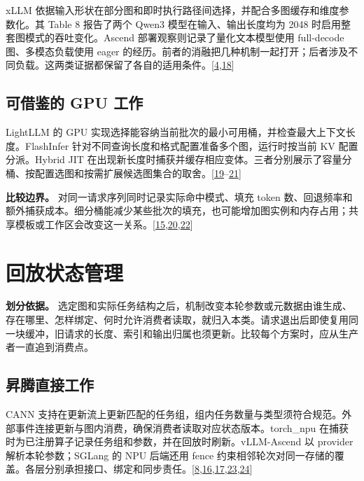 \documentclass[
  UTF8,
  zihao=5]{ctexart}
\begin{document}
xLLM
依据输入形状在部分图和即时执行路径间选择，并配合多图缓存和维度参数化。其
Table 8 报告了两个 Qwen3 模型在输入、输出长度均为 2048
时启用整套图模式的吞吐变化。Ascend 部署观察则记录了量化文本模型使用
full-decode 图、多模态负载使用 eager
的经历。前者的消融把几种机制一起打开；后者涉及不同负载。这两类证据都保留了各自的适用条件。{[}\protect\hyperlink{ref-liu2025xllm}{4},\protect\hyperlink{ref-yu2026ascendfield}{18}{]}

\hypertarget{ux53efux501fux9274ux7684-gpu-ux5de5ux4f5c-1}{%
\subsection{可借鉴的 GPU
工作}\label{ux53efux501fux9274ux7684-gpu-ux5de5ux4f5c-1}}

LightLLM 的 GPU
实现选择能容纳当前批次的最小可用桶，并检查最大上下文长度。FlashInfer
针对不同查询长度和格式配置准备多个图，运行时按当前 KV 配置分派。Hybrid
JIT
在出现新长度时捕获并缓存相应变体。三者分别展示了容量分桶、按配置选图和按需扩展候选图集合的取舍。{[}\protect\hyperlink{ref-lightllm2026code}{19}--\protect\hyperlink{ref-yadav2026hybridpreprint}{21}{]}

\textbf{比较边界。} 对同一请求序列同时记录实际命中模式、填充 token
数、回退频率和额外捕获成本。细分桶能减少某些批次的填充，也可能增加图实例和内存占用；共享模板或工作区会改变这一关系。{[}\protect\hyperlink{ref-vllmascendmode}{15},\protect\hyperlink{ref-ye2025flashinfer}{20},\protect\hyperlink{ref-liu2026foundry}{22}{]}

\hypertarget{replay-state}{%
\section{回放状态管理}\label{replay-state}}

\textbf{划分依据。}
选定图和实际任务结构之后，机制改变本轮参数或元数据由谁生成、存在哪里、怎样绑定、何时允许消费者读取，就归入本类。请求退出后即使复用同一块缓冲，旧请求的长度、索引和输出归属也须更新。比较每个方案时，应从生产者一直追到消费点。

\hypertarget{ux6607ux817eux76f4ux63a5ux5de5ux4f5c-2}{%
\subsection{昇腾直接工作}\label{ux6607ux817eux76f4ux63a5ux5de5ux4f5c-2}}

CANN
支持在更新流上更新匹配的任务组，组内任务数量与类型须符合规范。外部事件连接更新与图内消费，确保消费者读取对应状态版本。torch\_npu
在捕获时为已注册算子记录任务组和参数，并在回放时刷新。vLLM-Ascend 以
provider 解析本轮参数；SGLang 的 NPU 后端还用 fence
约束相邻轮次对同一存储的覆盖。各层分别承担接口、绑定和同步责任。{[}\protect\hyperlink{ref-cann910update}{8},\protect\hyperlink{ref-vllmascend2026impl}{16},\protect\hyperlink{ref-sglang2026impl}{17},\protect\hyperlink{ref-cann850updateapi}{23},\protect\hyperlink{ref-torchnpu2026graphs}{24}{]}
\end{document}
